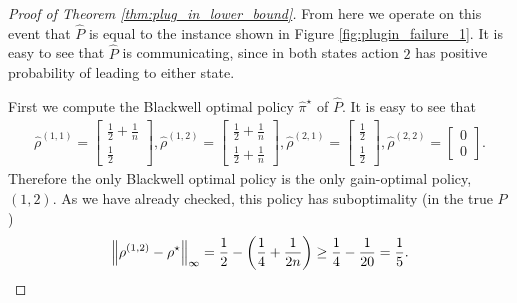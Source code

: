 \documentclass{article}
\theoremstyle{plain}
\theoremstyle{plain}
\theoremstyle{remark}
\theoremstyle{plain}
\theoremstyle{plain}
\newcommand{\Phat}{\widehat{P}}
\newcommand{\pihstar}{\widehat{\pi}^\star}
\newcommand{\rhohat}{\widehat{\rho}}
\begin{document}
\begin{proof}[Proof of Theorem \ref{thm:plug_in_lower_bound}]
From here we operate on this event that $\Phat$ is equal to the instance shown in Figure \ref{fig:plugin_failure_1}. It is easy to see that $\Phat$ is communicating, since in both states action $2$ has positive probability of leading to either state. 

First we compute the Blackwell optimal policy $\pihstar$ of $\Phat$. It is easy to see that
\begin{align*}
    \rhohat^{(1,1)} = \begin{bmatrix}
        \frac{1}{2} + \frac{1}{n} \\ \frac{1}{2}
    \end{bmatrix},
    \rhohat^{(1,2)} = \begin{bmatrix}
        \frac{1}{2} + \frac{1}{n} \\ \frac{1}{2} + \frac{1}{n}
    \end{bmatrix},  
    \rhohat^{(2,1)} = \begin{bmatrix}
        \frac{1}{2} \\ \frac{1}{2}
    \end{bmatrix},
     \rhohat^{(2,2)} = \begin{bmatrix}
        0 \\ 0
    \end{bmatrix}.
\end{align*}
Therefore the only Blackwell optimal policy is the only gain-optimal policy, $(1,2)$. 
As we have already checked, this policy has suboptimality (in the true $P$)
\[
\left\Vert \rho^{(1,2)} - \rho^\star\right\Vert _{\infty} = \frac{1}{2} - \left(\frac{1}{4} + \frac{1}{2n}\right) \geq \frac{1}{4} - \frac{1}{20} = \frac{1}{5}.
\]


\end{proof}
\end{document}
